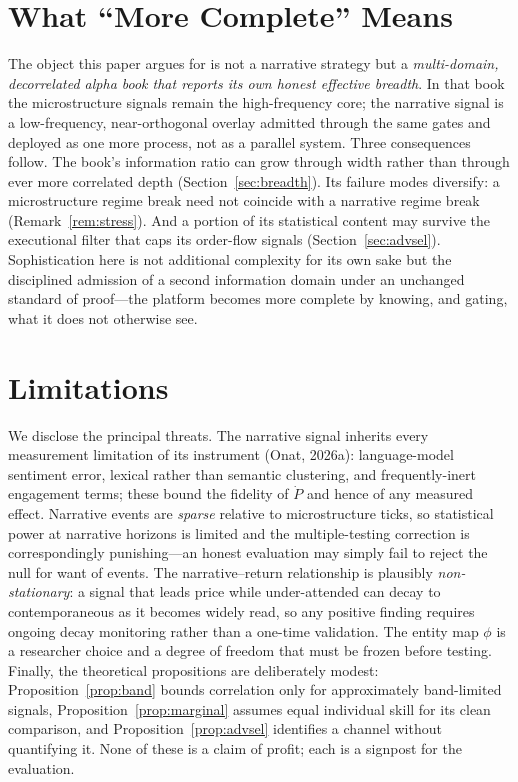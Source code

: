 \documentclass[11pt,a4paper]{article}
\theoremstyle{definition}
\theoremstyle{plain}
\begin{document}
\section{What ``More Complete'' Means}
\label{sec:complete}

The object this paper argues for is not a narrative strategy but a \emph{multi-domain, decorrelated
alpha book that reports its own honest effective breadth}. In that book the microstructure signals
remain the high-frequency core; the narrative signal is a low-frequency, near-orthogonal overlay
admitted through the same gates and deployed as one more process, not as a parallel system. Three
consequences follow. The book's information ratio can grow through width rather than through ever more
correlated depth (Section~\ref{sec:breadth}). Its failure modes diversify: a microstructure regime
break need not coincide with a narrative regime break (Remark~\ref{rem:stress}). And a portion of its
statistical content may survive the executional filter that caps its order-flow signals
(Section~\ref{sec:advsel}). Sophistication here is not additional complexity for its own sake but the
disciplined admission of a second information domain under an unchanged standard of proof---the
platform becomes more complete by knowing, and gating, what it does not otherwise see.

\section{Limitations}
\label{sec:limitations}

We disclose the principal threats. The narrative signal inherits every measurement limitation of its
instrument (Onat, 2026a): language-model sentiment error, lexical rather than semantic clustering, and
frequently-inert engagement terms; these bound the fidelity of $\dot P$ and hence of any measured
effect. Narrative events are \emph{sparse} relative to microstructure ticks, so statistical power at
narrative horizons is limited and the multiple-testing correction is correspondingly punishing---an
honest evaluation may simply fail to reject the null for want of events. The narrative--return
relationship is plausibly \emph{non-stationary}: a signal that leads price while under-attended can
decay to contemporaneous as it becomes widely read, so any positive finding requires ongoing decay
monitoring rather than a one-time validation. The entity map $\phi$ is a researcher choice and a
degree of freedom that must be frozen before testing. Finally, the theoretical propositions are
deliberately modest: Proposition~\ref{prop:band} bounds correlation only for approximately
band-limited signals, Proposition~\ref{prop:marginal} assumes equal individual skill for its clean
comparison, and Proposition~\ref{prop:advsel} identifies a channel without quantifying it. None of
these is a claim of profit; each is a signpost for the evaluation.
\end{document}
